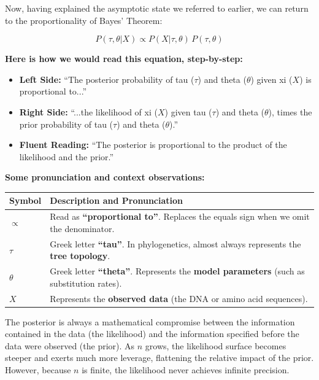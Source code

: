 Now, having explained the asymptotic state we referred to earlier, we can return to the proportionality of Bayes' Theorem:

$$P(\tau, \theta|X) \propto P(X|\tau, \theta) \, P(\tau, \theta)$$

\textbf{Here is how we would read this equation, step-by-step:}

\begin{itemize}
    \item \textbf{Left Side:} ``The posterior probability of tau ($\tau$) and theta ($\theta$) given xi ($X$) is proportional to...''
    \item \textbf{Right Side:} ``...the likelihood of xi ($X$) given tau ($\tau$) and theta ($\theta$), times the prior probability of tau ($\tau$) and theta ($\theta$).''
    \item \textbf{Fluent Reading:} ``The posterior is proportional to the product of the likelihood and the prior.''
\end{itemize}

\vspace{0.5cm}

\textbf{Some pronunciation and context observations:}

\begin{center}
\renewcommand{\arraystretch}{1.5}
\begin{tabular}{lp{10cm}}
\hline
\textbf{Symbol} & \textbf{Description and Pronunciation} \\ \hline
$\propto$ & Read as \textbf{``proportional to''}. Replaces the equals sign when we omit the denominator. \\
$\tau$ & Greek letter \textbf{``tau''}. In phylogenetics, almost always represents the \textbf{tree topology}. \\
$\theta$ & Greek letter \textbf{``theta''}. Represents the \textbf{model parameters} (such as substitution rates). \\
$X$ & Represents the \textbf{observed data} (the DNA or amino acid sequences). \\ \hline
\end{tabular}
\end{center}

The posterior is always a mathematical compromise between the information contained in the data (the likelihood) and the information specified before the data were observed (the prior). As $n$ grows, the likelihood surface becomes steeper and exerts much more leverage, flattening the relative impact of the prior. However, because $n$ is finite, the likelihood never achieves infinite precision.

